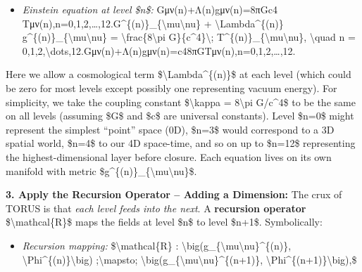 \documentclass[
]{article}
\begin{document}
\begin{itemize}
\item
  \emph{Einstein equation at level \$n\$:}
  Gμν(n)+Λ(n)gμν(n)=8πGc4  Tμν(n),n=0,1,2,\ldots,12.G\^{}\{(n)\}\_\{\textbackslash mu\textbackslash nu\}
  + \textbackslash Lambda\^{}\{(n)\}
  g\^{}\{(n)\}\_\{\textbackslash mu\textbackslash nu\} =
  \textbackslash frac\{8\textbackslash pi G\}\{c\^{}4\}\textbackslash;
  T\^{}\{(n)\}\_\{\textbackslash mu\textbackslash nu\},
  \textbackslash quad n =
  0,1,2,\textbackslash dots,12.Gμν(n)\hspace{0pt}+Λ(n)gμν(n)\hspace{0pt}=c48πG\hspace{0pt}Tμν(n)\hspace{0pt},n=0,1,2,\ldots,12.
\end{itemize}

Here we allow a cosmological term \$\textbackslash Lambda\^{}\{(n)\}\$
at each level (which could be zero for most levels except possibly one
representing vacuum energy). For simplicity, we take the coupling
constant \$\textbackslash kappa = 8\textbackslash pi G/c\^{}4\$ to be
the same on all levels (assuming \$G\$ and \$c\$ are universal
constants)\hspace{0pt}. Level \$n=0\$ might represent the simplest
``point'' space (0D), \$n=3\$ would correspond to a 3D spatial world,
\$n=4\$ to our 4D space-time, and so on up to \$n=12\$ representing the
highest-dimensional layer before closure. Each equation lives on its own
manifold with metric
\$g\^{}\{(n)\}\_\{\textbackslash mu\textbackslash nu\}\$.

\textbf{3. Apply the Recursion Operator -- Adding a Dimension:} The crux
of TORUS is that \emph{each level feeds into the next}. A
\textbf{recursion operator} \$\textbackslash mathcal\{R\}\$ maps the
fields at level \$n\$ to level \$n+1\$. Symbolically\hspace{0pt}:

\begin{itemize}
\item
  \emph{Recursion mapping:} \$\textbackslash mathcal\{R\} :
  \textbackslash big(g\_\{\textbackslash mu\textbackslash nu\}\^{}\{(n)\},
  \textbackslash Phi\^{}\{(n)\}\textbackslash big)
  ;\textbackslash mapsto;
  \textbackslash big(g\_\{\textbackslash mu\textbackslash nu\}\^{}\{(n+1)\},
  \textbackslash Phi\^{}\{(n+1)\}\textbackslash big),\$
\end{itemize}
\end{document}
